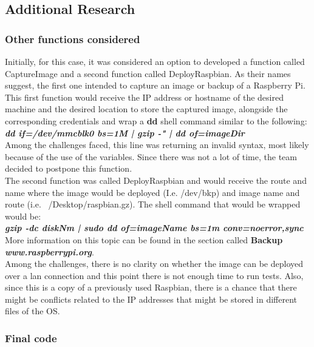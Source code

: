 \documentclass[sigconf]{acmart}
\begin{document}
	\subsection{Additional Research}
	
	\subsubsection{Other functions considered}
	Initially, for this case, it was considered an option to developed a function called CaptureImage and a second function called DeployRaspbian.
	As their names suggest, the first one intended to capture an image or backup of a Raspberry Pi.
	This first function would receive the IP address or hostname of the desired machine and the desired location to store the captured image, alongside the corresponding credentials and wrap a \textbf{dd} shell command similar to the following:\\ 
	\textbf{\textit{dd if=/dev/mmcblk0 bs=1M | gzip -" | dd of=imageDir}}\\
	Among the challenges faced, this line was returning an invalid syntax, most likely because of the use of the variables. Since there was not a lot of time, the team decided to postpone this function.\\
	
	The second function was called DeployRaspbian and would receive the route and name where the image would be deployed (I.e. /dev/bkp) and image name and route (i.e. ~/Desktop/raspbian.gz). The shell command that would be wrapped would be: \\
	\textbf{\textit{gzip -dc diskNm | sudo dd of=imageName bs=1m conv=noerror,sync}}\\

	More information on this topic can be found in the section called \textbf{Backup} \textbf{\textit{www.raspberrypi.org}}.\\
	
	Among the challenges, there is no clarity on whether the image can be deployed over a lan connection and this point there is not enough time to run tests.
	Also, since this is a copy of a previously used Raspbian, there is a chance that there might be conflicts related to the IP addresses that might be stored in different files of the OS. 
	
	\subsubsection{Final code}
	
\end{document}
